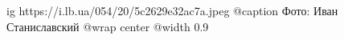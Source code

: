  
 
 
 
 

\ifcmt
  ig https://i.lb.ua/054/20/5c2629e32ac7a.jpeg
	@caption Фото: Иван Станиславский
  @wrap center
  @width 0.9
\fi
